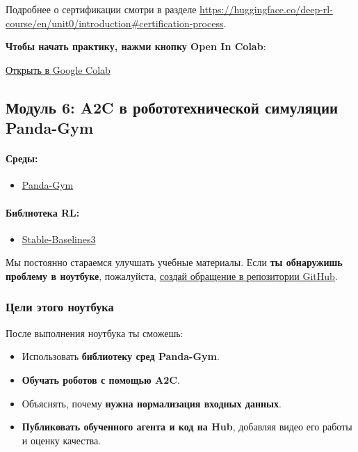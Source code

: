 \documentclass[11pt,a4paper]{article}
\begin{document}
Подробнее о сертификации смотри в разделе \url{https://huggingface.co/deep-rl-course/en/unit0/introduction#certification-process}.

\textbf{Чтобы начать практику, нажми кнопку Open In Colab}:

\href{https://colab.research.google.com/github/huggingface/deep-rl-class/blob/master/notebooks/unit6/unit6.ipynb}{Открыть в Google Colab}

\subsection{Модуль 6: A2C в робототехнической симуляции Panda-Gym}\label{unit-6-advantage-actor-critic-a2c-using-robotics-simulations-with-panda-gym}

\paragraph{Среды:}\label{environments}

\begin{itemize}
\tightlist
\item
  \href{https://github.com/qgallouedec/panda-gym}{Panda-Gym}
\end{itemize}

\paragraph{Библиотека RL:}\label{rl-library}

\begin{itemize}
\tightlist
\item
  \href{https://stable-baselines3.readthedocs.io/}{Stable-Baselines3}
\end{itemize}

Мы постоянно стараемся улучшать учебные материалы. Если \textbf{ты обнаружишь проблему в ноутбуке}, пожалуйста, \href{https://github.com/huggingface/deep-rl-class/issues}{создай обращение в репозитории GitHub}.

\subsubsection{Цели этого ноутбука}\label{objectives-of-this-notebook}

После выполнения ноутбука ты сможешь:

\begin{itemize}
\tightlist
\item
  Использовать \textbf{библиотеку сред Panda-Gym}.
\item
  \textbf{Обучать роботов с помощью A2C}.
\item
  Объяснять, почему \textbf{нужна нормализация входных данных}.
\item
  \textbf{Публиковать обученного агента и код на Hub}, добавляя видео его работы и оценку качества.
\end{itemize}
\end{document}
